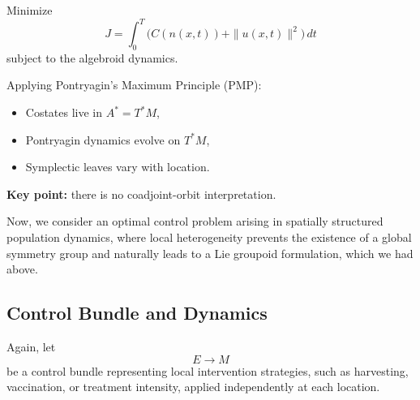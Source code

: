 \documentclass{article}
\begin{document}
Minimize
\[
J = \int_0^T \big( C(n(x,t)) + \|u(x,t)\|^2 \big) \, dt
\]
subject to the algebroid dynamics.  

Applying Pontryagin's Maximum Principle (PMP):
\begin{itemize}
    \item Costates live in $A^* = T^*M$,
    \item Pontryagin dynamics evolve on $T^*M$,
    \item Symplectic leaves vary with location.
\end{itemize}

\textbf{Key point:} there is no coadjoint-orbit interpretation.




Now, we consider an optimal control problem arising in spatially structured population dynamics, where local heterogeneity prevents the existence of a global symmetry group and naturally leads to a Lie groupoid formulation, which we had above.




\subsection*{Control Bundle and Dynamics}

Again, let
\[
E \to M
\]
be a control bundle representing local intervention strategies, such as harvesting, vaccination, or treatment intensity, applied independently at each location.
\end{document}
